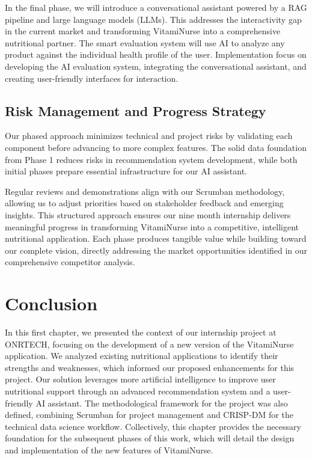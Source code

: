 In the final phase, we will introduce a conversational assistant powered by a RAG pipeline and large language models (LLMs). 
This addresses the interactivity gap in the current market and transforming VitamiNurse into a comprehensive nutritional partner. The smart evaluation system will use AI to analyze any product against the individual health profile of the user. 
Implementation focus on developing the AI evaluation system, integrating the conversational assistant, and creating user-friendly interfaces for interaction.


\subsection{Risk Management and Progress Strategy}

Our phased approach minimizes technical and project risks by validating each component before advancing to more complex features. The solid data foundation from Phase 1 reduces risks in recommendation system development, while both initial phases prepare essential infrastructure for our AI assistant. 

Regular reviews and demonstrations align with our Scrumban methodology, allowing us to adjust priorities based on stakeholder feedback and emerging insights. This structured approach ensures our nine month internship delivers meaningful progress in transforming VitamiNurse into a competitive, intelligent nutritional application. 
Each phase produces tangible value while building toward our complete vision, directly addressing the market opportunities identified in our comprehensive competitor analysis.


\section*{Conclusion}
In this first chapter, we presented the context of our internship project
at ONRTECH, focusing on the development of a new version of the VitamiNurse application.
We analyzed existing nutritional applications to identify their
strengths and weaknesses, which informed our proposed enhancements
for this project. Our solution leverages more artificial intelligence to
improve user nutritional support through an advanced recommendation system and a
user-friendly AI assistant. The methodological framework for the project was also defined,
 combining Scrumban for project management and CRISP-DM for the technical data science workflow. 
 Collectively, this chapter provides the necessary foundation for the subsequent phases of this work, 
 which will detail the design and implementation of the new features of VitamiNurse.